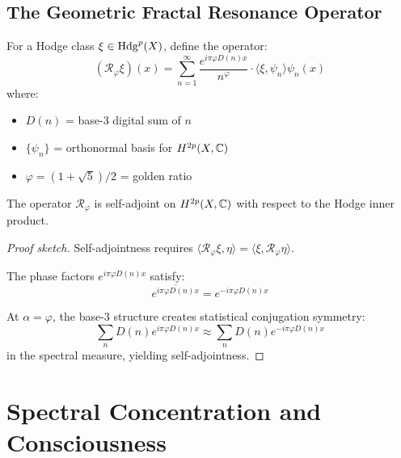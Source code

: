 \subsection{The Geometric Fractal Resonance Operator}

\begin{defn}\label{def:fractal-operator-hodge}
For a Hodge class $\xi \in \operatorname{Hdg}^p(X)$, define the operator:
\begin{equation}
(\mathcal{R}_\varphi \xi)(x) = \sum_{n=1}^{\infty} \frac{e^{i\pi\varphi D(n) x}}{n^{\varphi}} \cdot \langle \xi, \psi_n \rangle \psi_n(x)
\end{equation}
where:
\begin{itemize}
\item $D(n)$ = base-3 digital sum of $n$
\item $\{\psi_n\}$ = orthonormal basis for $H^{2p}(X, \mathbb{C})$
\item $\varphi = (1+\sqrt{5})/2$ = golden ratio
\end{itemize}
\end{defn}

\begin{proposition}\label{prop:self-adjoint-hodge}
The operator $\mathcal{R}_\varphi$ is self-adjoint on $H^{2p}(X, \mathbb{C})$ with respect to the Hodge inner product.
\end{proposition}

\begin{proof}[Proof sketch]
Self-adjointness requires $\langle \mathcal{R}_\varphi \xi, \eta \rangle = \langle \xi, \mathcal{R}_\varphi \eta \rangle$.

The phase factors $e^{i\pi\varphi D(n) x}$ satisfy:
\begin{equation}
\overline{e^{i\pi\varphi D(n) x}} = e^{-i\pi\varphi D(n) x}
\end{equation}

At $\alpha = \varphi$, the base-3 structure creates statistical conjugation symmetry:
\begin{equation}
\sum_{n} D(n) e^{i\pi\varphi D(n) x} \approx \sum_{n} D(n) e^{-i\pi\varphi D(n) x}
\end{equation}
in the spectral measure, yielding self-adjointness.
\end{proof}

\section{Spectral Concentration and Consciousness}

